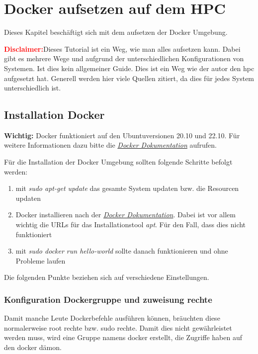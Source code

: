 \chapter{Docker aufsetzen auf dem HPC}
Dieses Kapitel beschäftigt sich mit dem aufsetzen der Docker Umgebung. 

\textcolor{red}{\textbf{Disclaimer:}}Dieses Tutorial ist ein Weg, wie man alles aufsetzen kann. Dabei gibt es mehrere Wege und aufgrund der unterschiedlichen Konfigurationen von Systemen. Ist dies kein allgemeiner Guide. Dies ist ein Weg wie der autor den \ac{hpc} aufgesetzt hat. Generell werden hier viele Quellen zitiert, da dies für jedes System unterschiedlich ist.

\section{Installation Docker}
\textbf{Wichtig:} Docker funktioniert auf den Ubuntuversionen 20.10 und 22.10. Für weitere Informationen dazu bitte die \textit{\href{https://docs.docker.com/engine/install/ubuntu/}{Docker Dokumentation}} aufrufen.

Für die Installation der Docker Umgebung sollten folgende Schritte befolgt werden:

\begin{enumerate}
    \item mit \textit{sudo apt-get update} das gesamte System updaten bzw. die Resourcen updaten
    \item Docker installieren nach der \textit{\href{https://docs.docker.com/engine/install/ubuntu/}{Docker Dokumentation}}. Dabei ist vor allem wichtig die URLs für das Installationstool \textit{apt}. Für den Fall, dass dies nicht funktioniert
    \item mit \textit{sudo docker run hello-world} sollte danach funktionieren und ohne Probleme laufen
\end{enumerate}

Die folgenden Punkte beziehen sich auf verschiedene Einstellungen.

\subsection{Konfiguration Dockergruppe und zuweisung rechte}
Damit manche Leute Dockerbefehle ausführen können, bräuchten diese normalerweise root rechte bzw. sudo rechte. Damit dies nicht gewährleistet werden muss, wird eine Gruppe namens docker erstellt, die Zugriffe haben auf den docker dämon. 


